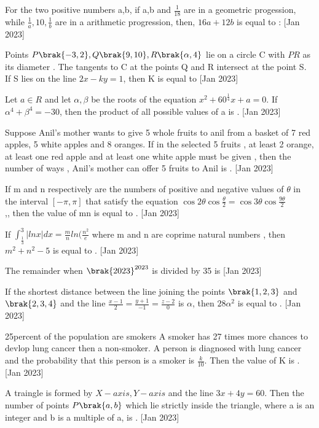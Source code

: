 
\iffalse
  \title{2023}
  \author{ai24btech11005}
  \section{integer}
\fi
    \item For the two positive numbers a,b, if a,b and $\frac{1}{18}$ are in a geometric progession, while $\frac{1}{a},10,\frac{1}{b}$ are in a arithmetic progression, then, $16a+12b$ is equal to :
    \hfill{[Jan 2023]}
    \item Points $P\brak{-3,2},Q\brak{9,10},R\brak{\alpha,4}$ lie on a circle C with $PR$ as its diameter . The tangents to C at the points Q and R intersect at the point S. If S lies on the line $2x-ky=1$, then K is equal to 
     \hfill{[Jan 2023]}
    \item Let $a\in R$ and let $\alpha,\beta$ be the roots of the equation $x^2+60^{\frac{1}{4}}x+a=0$. If $\alpha^4 +\beta^4=-30$, then the product of all possible values of a is .
 \hfill{[Jan 2023]}
    \item Suppose Anil's mother wants to give 5 whole fruits to anil from a basket of 7 red apples, 5 white apples and 8 oranges. If in the selected 5 fruits , at least 2 orange, at least one red apple and at least one white apple must be given , then the number of ways , Anil's  mother can offer 5 fruits to Anil is   .
     \hfill{[Jan 2023]}
    \item If m and n respectively are the numbers of positive and negative values of $\theta$ in the interval $[-\pi,\pi]$ that satisfy the equation $\cos 2\theta \cos{\frac{\theta}{2}}=\cos 3\theta \cos{\frac{9\theta}{2}}$ \\,, then the value of mn is equal to .
     \hfill{[Jan 2023]}

    \item If $\int_{\frac{1}{3}}^{3} |lnx|dx=\frac{m}{n}ln(\frac{n^2}{e}$ where m and n are coprime natural numbers , then $m^2+n^2-5$ is equal to .
     \hfill{[Jan 2023]}
    \item The remainder when $\brak{2023}^{2023}$ is divided by 35 is 
     \hfill{[Jan 2023]}

    \item If the shortest distance between the line joining the points $\brak{1,2,3}$ and $\brak{2,3,4}$ and the line $\frac{x-1}{2}=\frac{y+1}{-1}=\frac{z-2}{0}$ is $\alpha$, then $28\alpha^2$ is equal to . 
     \hfill{[Jan 2023]}
    \item 25percent of the population are smokers A smoker has 27 times more chances to devlop lung cancer then a non-smoker. A person is diagnosed with lung cancer and the probability that this person is a smoker is $\frac{k}{10}.$ Then the value of K is .
     \hfill{[Jan 2023]}
    \item A traingle is formed by $X-axis,Y-axis$ and the line $3x+4y=60$. Then the number of points $P\brak{a,b}$  which lie strictly inside  the triangle, where a is an integer and b is a multiple of a, is .
     \hfill{[Jan 2023]}

